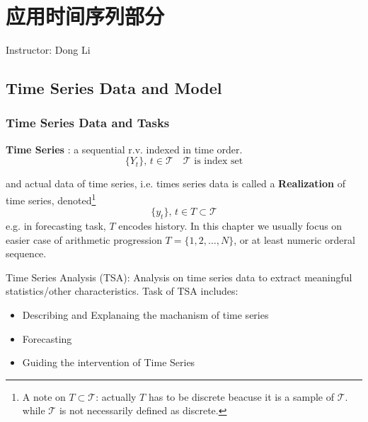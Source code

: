\chapter{应用时间序列部分}
\begin{center}
    Instructor: Dong Li
\end{center}


\section{Time Series Data and Model}


\subsection{Time Series Data and Tasks}
    \textbf{Time Series} : a sequential r.v. indexed in time order.
    \begin{equation}
        \{Y_t\},\,t\in \mathcal{T}\quad \mathcal{T}\text{ is index set} 
    \end{equation}

    and actual data of time series, i.e. times series data is called a \textbf{Realization}  of time series, denoted\footnote{A note on $ T\subset \mathcal{T} $: actually $ T $ has to be discrete beacuse it is a sample of $ \mathcal{T} $. while $ \mathcal{T} $ is not necessarily defined as discrete.}
    \[
        \{y_t\},\,t\in  T\subset\mathcal{T}
    \]
    e.g. in forecasting task, $ T $ encodes history. In this chapter we usually focus on easier case of arithmetic progression $ T=\{1,2,\dots,N\} $, or at least numeric orderal sequence.

    Time Series Analysis (TSA): Analysis on time series data to extract meaningful statistics/other characteristics. Task of TSA includes:
    \begin{itemize}[topsep=2pt,itemsep=0pt]
        \item Describing and Explanaing the machanism of time series 
        \item Forecasting
        \item Guiding the intervention of Time Series
    \end{itemize}

